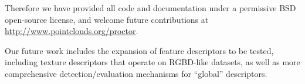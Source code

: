\documentclass[a4paper, 10pt, conference]{ieeeconf}      %
\newcommand{\note}[1]{\textcolor{red}{\textbf{#1}}}
\begin{document}
Therefore we have provided all code and documentation under a permissive BSD
open-source license, and welcome future
contributions at \url{http://www.pointclouds.org/proctor}.

Our future work includes the expansion of feature descriptors to be tested,
including texture descriptors that operate on RGBD-like datasets, as well as
more comprehensive detection/evaluation mechanisms for ``global'' descriptors.


% 

{\small


}
\end{document}
